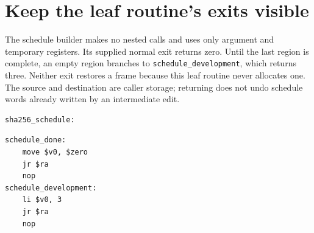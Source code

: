 \section{Keep the leaf routine's exits visible}
The schedule builder makes no nested calls and uses only argument and temporary
registers. Its supplied normal exit returns zero. Until the last region is complete,
an empty region branches to \texttt{schedule\_development}, which returns three.
Neither exit restores a frame because this leaf routine never allocates one. The
source and destination are caller storage; returning does not undo schedule words
already written by an intermediate edit.

\begin{verbatim}
sha256_schedule:
\end{verbatim}

\begin{verbatim}
schedule_done:
    move $v0, $zero
    jr $ra
    nop
schedule_development:
    li $v0, 3
    jr $ra
    nop

\end{verbatim}
